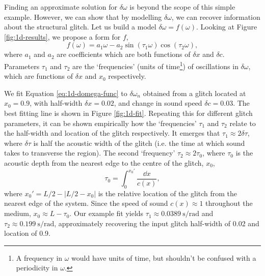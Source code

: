 Finding an approximate solution for \(\delta\omega\) is beyond the scope of this simple example. However, we can show that by modelling \(\delta\omega\), we can recover information about the structural glitch. Let us build a model \(\delta\omega = f(\omega)\). Looking at Figure \ref{fig:1d-results}, we propose a form for \(f\),
%
\begin{equation}
    f(\omega) = a_1 \omega - a_2 \sin (\tau_1 \omega) \cos (\tau_2 \omega), \label{eq:1d-domega-func}
\end{equation}
%
where \(a_1\) and \(a_2\) are coefficients which are both functions of \(\delta x\) and \(\delta c\). Parameters \(\tau_1\) and \(\tau_2\) are the `frequencies' (units of time\footnote{A frequency in \(\omega\) would have units of time, but shouldn't be confused with a periodicity in \(\omega\).}) of oscillations in \(\delta\omega\), which are functions of \(\delta x\) and \(x_0\) respectively.

We fit Equation \ref{eq:1d-domega-func} to \(\delta\omega_n\) obtained from a glitch located at \(x_0 = 0.9\), with half-width \(\delta x = 0.02\), and change in sound speed \(\delta c = 0.03\). The best fitting line is shown in Figure \ref{fig:1d-fit}. Repeating this for different glitch parameters, it can be shown empirically how the `frequencies' \(\tau_1\) and \(\tau_2\) relate to the half-width and location of the glitch respectively. It emerges that \(\tau_1 \approx 2\delta\tau\), where \(\delta\tau\) is half the acoustic width of the glitch (i.e. the time at which sound takes to transverse the region). The second `frequency' \(\tau_2 \approx 2\tau_0\), where \(\tau_0\) is the acoustic depth from the nearest edge to the centre of the glitch, \(x_0\),
%
\begin{equation}
    \tau_0 = \int_0^{x_0'} \frac{\dd x}{c(x)},
\end{equation}
%
where \(x_0' = L/2 - | L/2 - x_0 |\) is the relative location of the glitch from the nearest edge of the system. Since the speed of sound \(c(x) \approx 1\) throughout the medium, \(x_0 \approx L - \tau_0\). Our example fit yields \(\tau_1 \approx \SI{0.0389}{\second\per\radian}\) and \(\tau_2 \approx \SI{0.199}{\second\per\radian}\), approximately recovering the input glitch half-width of \num{0.02} and location of \num{0.9}.


